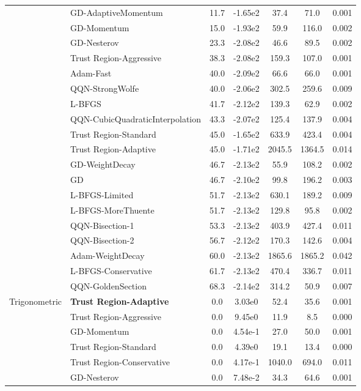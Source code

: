 \documentclass{article}
\begin{document}
\begin{table}[htbp]
{\begin{tabular}{p{2.5cm}p{2.5cm}*{5}{c}}
 & GD-AdaptiveMomentum & 11.7 & -1.65e2 & 37.4 & 71.0 & 0.001 \\
 & GD-Momentum & 15.0 & -1.93e2 & 59.9 & 116.0 & 0.002 \\
 & GD-Nesterov & 23.3 & -2.08e2 & 46.6 & 89.5 & 0.002 \\
 & Trust Region-Aggressive & 38.3 & -2.08e2 & 159.3 & 107.0 & 0.001 \\
 & Adam-Fast & 40.0 & -2.09e2 & 66.6 & 66.0 & 0.001 \\
 & QQN-StrongWolfe & 40.0 & -2.06e2 & 302.5 & 259.6 & 0.009 \\
 & L-BFGS & 41.7 & -2.12e2 & 139.3 & 62.9 & 0.002 \\
 & QQN-CubicQuadraticInterpolation & 43.3 & -2.07e2 & 125.4 & 137.9 & 0.004 \\
 & Trust Region-Standard & 45.0 & -1.65e2 & 633.9 & 423.4 & 0.004 \\
 & Trust Region-Adaptive & 45.0 & -1.71e2 & 2045.5 & 1364.5 & 0.014 \\
 & GD-WeightDecay & 46.7 & -2.13e2 & 55.9 & 108.2 & 0.002 \\
 & GD & 46.7 & -2.10e2 & 99.8 & 196.2 & 0.003 \\
 & L-BFGS-Limited & 51.7 & -2.13e2 & 630.1 & 189.2 & 0.009 \\
 & L-BFGS-MoreThuente & 51.7 & -2.13e2 & 129.8 & 95.8 & 0.002 \\
 & QQN-Bisection-1 & 53.3 & -2.13e2 & 403.9 & 427.4 & 0.011 \\
 & QQN-Bisection-2 & 56.7 & -2.12e2 & 170.3 & 142.6 & 0.004 \\
 & Adam-WeightDecay & 60.0 & -2.13e2 & 1865.6 & 1865.2 & 0.042 \\
 & L-BFGS-Conservative & 61.7 & -2.13e2 & 470.4 & 336.7 & 0.011 \\
 & QQN-GoldenSection & 68.3 & -2.14e2 & 314.2 & 50.9 & 0.007 \\
\midrule
\multirow{25}{*}{Trigonometric} & \textbf{Trust Region-Adaptive} & 0.0 & 3.03e0 & 52.4 & 35.6 & 0.001 \\
 & Trust Region-Aggressive & 0.0 & 9.45e0 & 11.9 & 8.5 & 0.000 \\
 & GD-Momentum & 0.0 & 4.54e-1 & 27.0 & 50.0 & 0.001 \\
 & Trust Region-Standard & 0.0 & 4.39e0 & 19.1 & 13.4 & 0.000 \\
 & Trust Region-Conservative & 0.0 & 4.17e-1 & 1040.0 & 694.0 & 0.011 \\
 & GD-Nesterov & 0.0 & 7.48e-2 & 34.3 & 64.6 & 0.001 \\

\end{tabular}}
\end{table}
\end{document}
